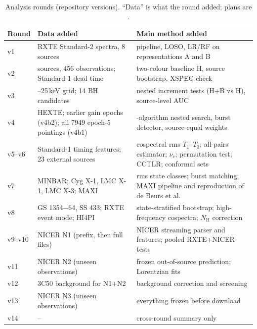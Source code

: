 \begin{table}[htbp]
\centering\footnotesize
\caption{Analysis rounds (repository versions). ``Data'' is what the round added; plans are
.}\label{tab:rounds}
\begin{tabularx}{\textwidth}{@{}l >{\raggedright\arraybackslash}X >{\raggedright\arraybackslash}X@{}}
\toprule
Round & Data added & Main method added \\
\midrule
v1 & RXTE Standard-2 spectra, 8 sources & pipeline, LOSO, LR/RF on representations A and B \\
v2 & 31 sources, 456 observations; Standard-1 dead time & two-colour baseline H, source bootstrap, XSPEC check \\
v3 & 3--25\,keV grid; 14 BH candidates & nested increment tests (H+B vs H), source-level AUC \\
v4 & HEXTE; earlier gain epochs (v4b2); all 7949 epoch-5 pointings (v4b1) & 8-algorithm nested search, burst detector, source-equal weights \\
v5--v6 & Standard-1 timing features; 23 external sources & cospectral rms $T_1$--$T_3$; all-pairs estimator; $\nu_c$; permutation test; CCTLR; conformal sets \\
v7 & MINBAR; Cyg X-1, LMC X-1, LMC X-3; MAXI & rms state classes; burst matching; MAXI pipeline and reproduction of de Beurs et al. \\
v8 & GS 1354$-$64, SS 433; RXTE event mode; HI4PI & state-stratified bootstrap; high-frequency cospectra; $N_\mathrm{H}$ correction \\
v9--v10 & NICER N1 (prefix, then full files) & NICER streaming parser and features; pooled RXTE+NICER tests \\
v11 & NICER N2 (unseen observations) & frozen out-of-source prediction; Lorentzian fits \\
v12 & 3C50 background for N1+N2 & background correction and screening \\
v13 & NICER N3 (unseen observations) & everything frozen before download \\
v14 & -- & cross-round summary only \\
\bottomrule
\end{tabularx}
\end{table}

